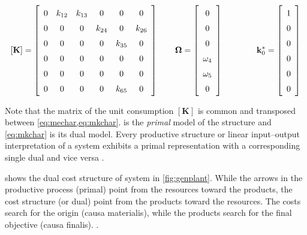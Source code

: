 \documentclass[energies,article,submit,moreauthors,pdftex]{Definitions/mdpi}
\newcommand{\vm}[1]{\ensuremath{\mathbf{#1}}}
\begin{document}
\begin{equation*}
    \def\arraystretch{1.5}
    \left[\vm{K}\right]=\left[\begin{array}{cccccc}
    0 & k_{12} & k_{13} & 0 & 0 & 0 \\
    0 & 0 & 0 & k_{24} & 0 & k_{26} \\
    0 & 0 & 0 & 0 & k_{35} & 0 \\
    0 & 0 & 0 & 0 & 0 & 0 \\
    0 & 0 & 0 & 0 & 0 & 0 \\
    0 & 0 & 0 & 0 & k_{65} & 0
    \end{array}
    \right]
    \qquad
    \vm{\Omega}=\left[\begin{array}{c}
    0 \\
    0 \\
    0 \\
    \omega_4 \\
    \omega_5 \\
    0
    \end{array}
    \right]
    \qquad
    \qquad
    \vm{k}_0^*=\left[\begin{array}{c}
    1 \\
    0 \\
    0 \\
    0 \\
    0 \\
    0
    \end{array}
    \right]
\end{equation*}

Note that the matrix of the unit consumption $\left[\vm{K}\right]$ is common and transposed between \cref{eq:mechar,eq:mkchar}.  is the \emph{primal} model of the structure and \cref{eq:mkchar} is its dual model. Every productive structure or linear input–output interpretation of a system exhibits a primal representation with a corresponding single dual and vice versa \cite{Boyd2004}.

 shows the dual cost structure of system in \cref{fig:genplant}. While the arrows in the productive process (primal) point from the resources toward the products, the cost structure (or dual) point from the products toward the resources. The costs search for the origin (causa materialis), while the products search for the final objective (causa finalis). \cite{Valero1990d}.
\end{document}
